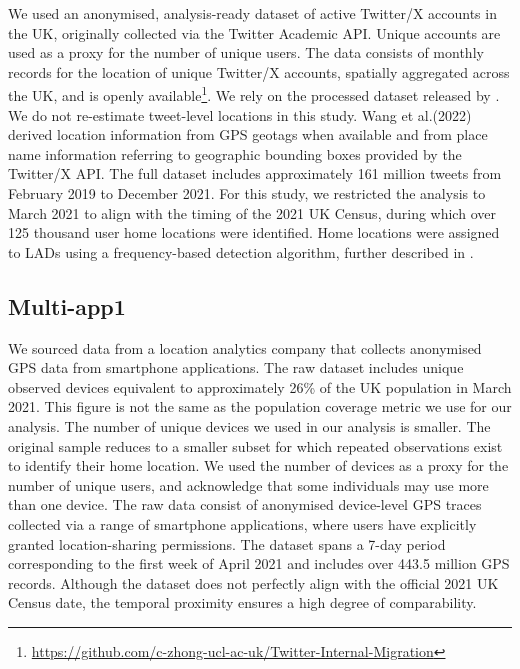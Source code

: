 \documentclass[]{rsos}%
\begin{document}
We used an anonymised, analysis-ready dataset of active Twitter/X
accounts in the UK, originally collected via the Twitter Academic API.
Unique accounts are used as a proxy for the number of unique users. The
data consists of monthly records for the location of unique Twitter/X
accounts, spatially aggregated across the UK, and is openly
available\footnote{\url{https://github.com/c-zhong-ucl-ac-uk/Twitter-Internal-Migration}}. We rely on the processed dataset released by \citep{wang2022}.
We do not re-estimate tweet-level locations in this study. Wang et
al.(2022) derived location information from GPS geotags when available
and from place name information referring to geographic bounding boxes
provided by the Twitter/X API. The full dataset includes approximately
161 million tweets from February 2019 to December 2021. For this study,
we restricted the analysis to March 2021 to align with the timing of the
2021 UK Census, during which over 125 thousand user home locations were
identified. Home locations were assigned to LADs using a frequency-based
detection algorithm, further described in \citep{wang2022}.

\subsection{Multi-app1}\label{multi-app1}

We sourced data from a location analytics company that collects
anonymised GPS data from smartphone applications. The raw dataset
includes unique observed devices equivalent to approximately 26\% of the
UK population in March 2021. This figure is not the same as the
population coverage metric we use for our analysis. The number of unique
devices we used in our analysis is smaller. The original sample reduces
to a smaller subset for which repeated observations exist to identify
their home location. We used the number of devices as a proxy for the
number of unique users, and acknowledge that some individuals may use
more than one device. The raw data consist of anonymised device-level
GPS traces collected via a range of smartphone applications, where users
have explicitly granted location-sharing permissions. The dataset spans
a 7-day period corresponding to the first week of April 2021 and
includes over 443.5 million GPS records. Although the dataset does not
perfectly align with the official 2021 UK Census date, the temporal
proximity ensures a high degree of comparability.
\end{document}
